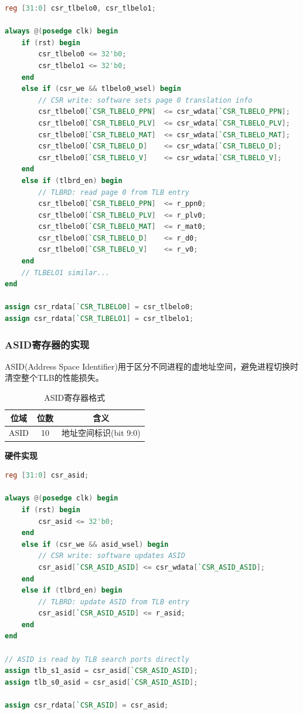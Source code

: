 \begin{lstlisting}[language=Verilog, caption=TLBELO寄存器实现]
reg [31:0] csr_tlbelo0, csr_tlbelo1;

always @(posedge clk) begin
    if (rst) begin
        csr_tlbelo0 <= 32'b0;
        csr_tlbelo1 <= 32'b0;
    end
    else if (csr_we && tlbelo0_wsel) begin
        // CSR write: software sets page 0 translation info
        csr_tlbelo0[`CSR_TLBELO_PPN]  <= csr_wdata[`CSR_TLBELO_PPN];
        csr_tlbelo0[`CSR_TLBELO_PLV]  <= csr_wdata[`CSR_TLBELO_PLV];
        csr_tlbelo0[`CSR_TLBELO_MAT]  <= csr_wdata[`CSR_TLBELO_MAT];
        csr_tlbelo0[`CSR_TLBELO_D]    <= csr_wdata[`CSR_TLBELO_D];
        csr_tlbelo0[`CSR_TLBELO_V]    <= csr_wdata[`CSR_TLBELO_V];
    end
    else if (tlbrd_en) begin
        // TLBRD: read page 0 from TLB entry
        csr_tlbelo0[`CSR_TLBELO_PPN]  <= r_ppn0;
        csr_tlbelo0[`CSR_TLBELO_PLV]  <= r_plv0;
        csr_tlbelo0[`CSR_TLBELO_MAT]  <= r_mat0;
        csr_tlbelo0[`CSR_TLBELO_D]    <= r_d0;
        csr_tlbelo0[`CSR_TLBELO_V]    <= r_v0;
    end
    // TLBELO1 similar...
end

assign csr_rdata[`CSR_TLBELO0] = csr_tlbelo0;
assign csr_rdata[`CSR_TLBELO1] = csr_tlbelo1;
\end{lstlisting}

\subsubsection{ASID寄存器的实现}

ASID(Address Space Identifier)用于区分不同进程的虚地址空间，避免进程切换时清空整个TLB的性能损失。

\begin{table}[h]
\centering
\caption{ASID寄存器格式}
\begin{tabular}{|c|c|c|}
\hline
\textbf{位域} & \textbf{位数} & \textbf{含义} \\
\hline
ASID & 10 & 地址空间标识(bit 9:0) \\
\hline
\end{tabular}
\end{table}

\noindent\textbf{硬件实现}

\begin{lstlisting}[language=Verilog, caption=ASID寄存器实现]
reg [31:0] csr_asid;

always @(posedge clk) begin
    if (rst) begin
        csr_asid <= 32'b0;
    end
    else if (csr_we && asid_wsel) begin
        // CSR write: software updates ASID
        csr_asid[`CSR_ASID_ASID] <= csr_wdata[`CSR_ASID_ASID];
    end
    else if (tlbrd_en) begin
        // TLBRD: update ASID from TLB entry
        csr_asid[`CSR_ASID_ASID] <= r_asid;
    end
end

// ASID is read by TLB search ports directly
assign tlb_s1_asid = csr_asid[`CSR_ASID_ASID];
assign tlb_s0_asid = csr_asid[`CSR_ASID_ASID];

assign csr_rdata[`CSR_ASID] = csr_asid;
\end{lstlisting}

